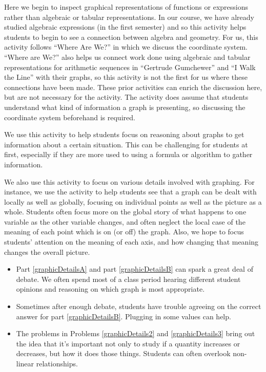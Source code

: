 \documentclass{ximera}
\begin{document}
\newpage

\begin{instructorNotes}
Here we begin to inspect graphical representations of functions or expressions rather than algebraic or tabular representations.  In our course, we have already studied algebraic expressions (in the first semester) and so this activity helps students to begin to see a connection between algebra and geometry.  For us, this activity follows ``Where Are We?'' in which we discuss the coordinate system.  ``Where are We?'' also helps us connect work done using algebraic and tabular representations for arithmetic sequences in ``Gertrude Gumchewer'' and ``I Walk the Line'' with their graphs, so this activity is not the first for us where these connections have been made.  These prior activities can enrich the discussion here, but are not necessary for the activity.  The activity does assume that students understand what kind of information a graph is presenting, so discussing the coordinate system beforehand is required.

We use this activity to help students focus on reasoning about graphs to get information about a certain situation.  This can be challenging for students at first, especially if they are more used to using a formula or algorithm to gather information.

We also use this activity to focus on various details involved with graphing.  For instance, we use the activity to help students see that a graph can be dealt with locally as well as globally, focusing on individual points as well as the picture as a whole.  Students often focus more on the global story of what happens to one variable as the other variable changes, and often neglect the local case of the meaning of each point which is on (or off) the graph.  Also, we hope to focus students' attention on the meaning of each axis, and how changing that meaning changes the overall picture.



\begin{itemize}
    \item Part \ref{graphicDetailsA} and part \ref{graphicDetailsB} can spark a great deal of debate.  We often spend most of a class period hearing different student opinions and reasoning on which graph is most appropriate.
    \item Sometimes after enough debate, students have trouble agreeing on the correct answer for part \ref{graphicDetailsB}.  Plugging in some values can help.
    \item The problems in Problems \ref{graphicDetails2} and \ref{graphicDetails3} bring out the idea that it's important not only to study if a quantity increases or decreases, but how it does those things.  Students can often overlook non-linear relationships.
\end{itemize}




\end{instructorNotes}
\end{document}
